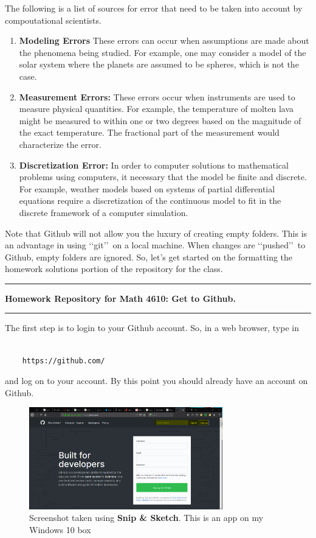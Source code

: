 \documentclass[10pt,fleqn]{article}
\begin{document}
The following is a list of sources for error that need to be taken into account
by compoutational scientists.
\begin{enumerate}
  \item {\bf Modeling Errors} These errors can occur when assumptions are made
        about the phenomena being studied. For example, one may consider a model
        of the solar system where the planets are assumed to be spheres, which
        is not the case.
  \item {\bf Measurement Errors:} These errors occur when instruments are used
        to measure physical quantities. For example, the temperature of molten
        lava might be measured to within one or two degrees based on the
        magnitude of the exact temperature. The fractional part of the 
        measurement would characterize the error.
  \item {\bf Discretization Error:} In order to computer solutions to
        mathematical problems using computers, it necessary that the model be
        finite and discrete. For example, weather models based on systems of
        partial differential equations require a discretization of the continuous model to fit in the
        discrete framework of a computer simulation.
\end{enumerate}
Note that Github will not allow you the luxury of creating empty folders. This
is an advantage in using \lq\lq git\rq\rq\ on a local machine. When changes are
\lq\lq pushed\rq\rq\ to Github, empty folders are ignored. So, let's get started
on the formatting the homework solutions portion of the repository for the
class.
\newpage
\vskip0.1in\hrule\vskip0.1in
\noindent
{\bf Homework Repository for Math 4610: Get to Github.} 
\vskip0.1in\hrule\vskip0.1in
The first step is to login to your Github account. So, in a web browser, type in
\begin{verbatim}

    https://github.com/

\end{verbatim}
and log on to your account. By this point you should already have an account on
Github.
\vfill
\begin{figure}[h]
\centering
\includegraphics[width=0.75\textwidth]{../images/github_01.png}
\caption{{Screenshot} taken using {\bf Snip \& Sketch}. This is an app on
         my Windows 10 box}
\end{figure}
\end{document}
